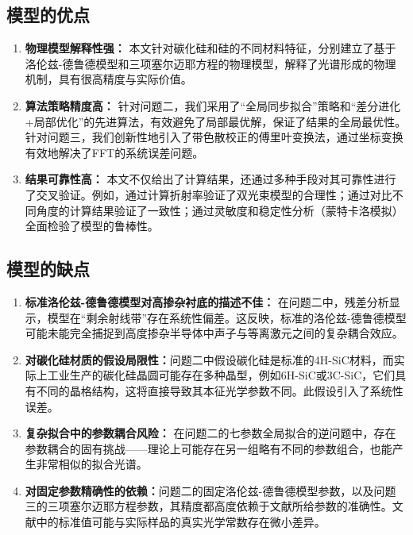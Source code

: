 \documentclass[a4paper]{ctexart}
\begin{document}
\subsection{模型的优点}
\begin{enumerate}
    \item \textbf{物理模型解释性强：} 本文针对碳化硅和硅的不同材料特征，分别建立了基于洛伦兹-德鲁德模型和三项塞尔迈耶方程的物理模型，解释了光谱形成的物理机制，具有很高精度与实际价值。

    \item \textbf{算法策略精度高：} 
    针对问题二，我们采用了“全局同步拟合”策略和“差分进化+局部优化”的先进算法，有效避免了局部最优解，保证了结果的全局最优性。
    针对问题三，我们创新性地引入了带色散校正的傅里叶变换法，通过坐标变换有效地解决了FFT的系统误差问题。

    \item \textbf{结果可靠性高：} 本文不仅给出了计算结果，还通过多种手段对其可靠性进行了交叉验证。例如，通过计算折射率验证了双光束模型的合理性；通过对比不同角度的计算结果验证了一致性；通过灵敏度和稳定性分析（蒙特卡洛模拟）全面检验了模型的鲁棒性。

\end{enumerate}

\subsection{模型的缺点}
\begin{enumerate}
    \item \textbf{标准洛伦兹-德鲁德模型对高掺杂衬底的描述不佳：} 在问题二中，残差分析显示，模型在“剩余射线带”存在系统性偏差。这反映，标准的洛伦兹-德鲁德模型可能未能完全捕捉到高度掺杂半导体中声子与等离激元之间的复杂耦合效应。
    \item \textbf{对碳化硅材质的假设局限性：}问题二中假设碳化硅是标准的4H-SiC材料，而实际上工业生产的碳化硅晶圆可能存在多种晶型，例如6H-SiC或3C-SiC，它们具有不同的晶格结构，这将直接导致其本征光学参数不同。此假设引入了系统性误差。
    \item \textbf{复杂拟合中的参数耦合风险：} 在问题二的七参数全局拟合的逆问题中，存在参数耦合的固有挑战——理论上可能存在另一组略有不同的参数组合，也能产生非常相似的拟合光谱。
    \item \textbf{对固定参数精确性的依赖：}问题二的固定洛伦兹-德鲁德模型参数，以及问题三的三项塞尔迈耶方程参数，其精度都高度依赖于文献所给参数的准确性。文献中的标准值可能与实际样品的真实光学常数存在微小差异。
\end{enumerate}
\end{document}
